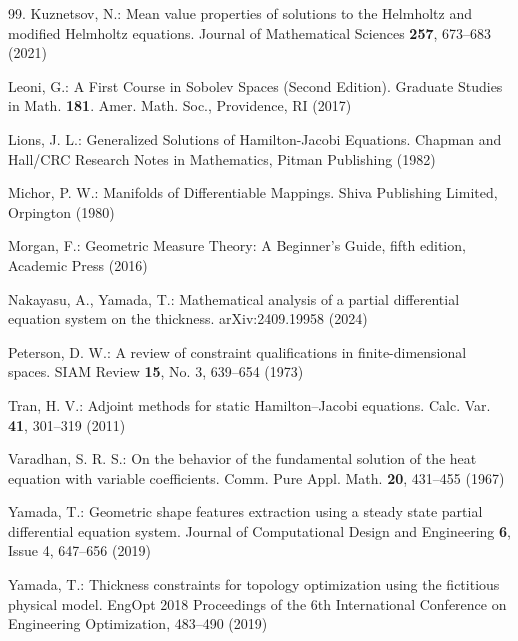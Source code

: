 \documentclass[graybox]{svmult}
\begin{document}
\begin{thebibliography}{99.}
 Kuznetsov, N.: Mean value properties of solutions to the Helmholtz and modified Helmholtz equations. Journal of Mathematical Sciences {\bf 257}, 673--683  (2021) 

 Leoni, G.: A First Course in Sobolev Spaces (Second Edition). Graduate Studies in Math. {\bf 181}. Amer. Math. Soc., Providence, RI (2017) 


  Lions, J. L.: Generalized Solutions of Hamilton-Jacobi Equations. Chapman and Hall/CRC Research Notes in Mathematics,
        Pitman Publishing (1982)
 
 Michor, P. W.: Manifolds of Differentiable Mappings. Shiva Publishing Limited, Orpington (1980)

 Morgan, F.: Geometric Measure Theory: A Beginner's Guide, fifth edition, Academic Press (2016)

 Nakayasu, A., Yamada, T.: Mathematical analysis of a partial differential equation system on the thickness. arXiv:2409.19958 (2024)

 Peterson, D. W.: A review of constraint qualifications in finite-dimensional spaces.  SIAM Review {\bf 15}, No. 3, 639--654 (1973)


 Tran, H. V.: Adjoint methods for static Hamilton--Jacobi equations. Calc. Var. {\bf 41}, 301--319 (2011) 

  Varadhan, S. R. S.:  
  On the behavior of the fundamental solution of the heat equation with variable coefficients. 
        Comm. Pure Appl. Math. \textbf{20}, 431--455  (1967)  



	Yamada, T.: 
	Geometric shape features extraction using a steady state partial differential equation system. 
	Journal of Computational Design and Engineering \textbf{6}, Issue 4, 647--656 (2019)


	Yamada, T.: 
	Thickness constraints for topology optimization using the fictitious physical model. 
	EngOpt 2018 Proceedings of the 6th International Conference on Engineering Optimization, 
	 483--490 (2019) 


\end{thebibliography}
\end{document}
